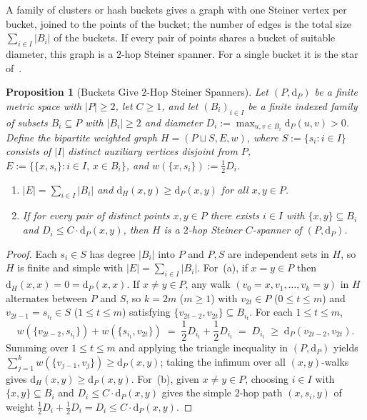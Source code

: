 \documentclass[11pt]{article}
\newtheorem{proposition}[theorem]{Proposition}
\theoremstyle{definition}
\theoremstyle{remark}
\newcommand{\dH}{\mathrm{d}_H}
\newcommand{\dP}{\mathrm{d}_P}
\begin{document}
A family of clusters or hash buckets gives a graph with one Steiner vertex per bucket, joined to the points of the bucket; the number of edges is the total size $\sum_{i \in I} |B_i|$ of the buckets. If every pair of points shares a bucket of suitable diameter, this graph is a $2$-hop Steiner spanner. For a single bucket it is the star of~\cite{andoni2023subquadratic}.

\begin{proposition}[Buckets Give $2$-Hop Steiner Spanners]
\label{prop:bucketing}
Let $(P, \dP)$ be a finite metric space with $|P| \ge 2$, let $C \ge 1$, and let $(B_i)_{i \in I}$ be a finite indexed family of subsets $B_i \subseteq P$ with $|B_i| \ge 2$ and diameter $D_i := \max_{u, v \in B_i} \dP(u, v) > 0$. Define the bipartite weighted graph $H = (P \sqcup S, E, w)$, where $S := \{s_i : i \in I\}$ consists of $|I|$ distinct auxiliary vertices disjoint from $P$, $E := \{\{x, s_i\} : i \in I,\, x \in B_i\}$, and $w(\{x, s_i\}) := \frac{1}{2} D_i$.
\begin{enumerate}[label=(\alph*),nosep]
  \item $|E| = \sum_{i \in I} |B_i|$ and $\dH(x, y) \ge \dP(x, y)$ for all $x, y \in P$.
  \item If for every pair of distinct points $x, y \in P$ there exists $i \in I$ with $\{x, y\} \subseteq B_i$ and $D_i \le C \cdot \dP(x, y)$, then $H$ is a $2$-hop Steiner $C$-spanner of $(P, \dP)$.
\end{enumerate}
\end{proposition}

\begin{proof}
Each $s_i \in S$ has degree $|B_i|$ into $P$ and $P, S$ are independent sets in $H$, so $H$ is finite and simple with $|E| = \sum_{i \in I} |B_i|$. For~(a), if $x = y \in P$ then $\dH(x, x) = 0 = \dP(x, x)$. If $x \ne y \in P$, any walk $(v_0 = x, v_1, \dots, v_k = y)$ in $H$ alternates between $P$ and $S$, so $k = 2m$ ($m \ge 1$) with $v_{2t} \in P$ ($0 \le t \le m$) and $v_{2t-1} = s_{i_t} \in S$ ($1 \le t \le m$) satisfying $\{v_{2t-2}, v_{2t}\} \subseteq B_{i_t}$. For each $1 \le t \le m$,
\[
w(\{v_{2t-2}, s_{i_t}\}) + w(\{s_{i_t}, v_{2t}\}) \;=\; \frac{1}{2} D_{i_t} + \frac{1}{2} D_{i_t} \;=\; D_{i_t} \;\ge\; \dP(v_{2t-2}, v_{2t}).
\]
Summing over $1 \le t \le m$ and applying the triangle inequality in $(P, \dP)$ yields $\sum_{j=1}^k w(\{v_{j-1}, v_j\}) \ge \dP(x, y)$; taking the infimum over all $(x, y)$-walks gives $\dH(x, y) \ge \dP(x, y)$. For~(b), given $x \ne y \in P$, choosing $i \in I$ with $\{x, y\} \subseteq B_i$ and $D_i \le C \cdot \dP(x, y)$ gives the simple $2$-hop path $(x, s_i, y)$ of weight $\frac{1}{2} D_i + \frac{1}{2} D_i = D_i \le C \cdot \dP(x, y)$.
\end{proof}
\end{document}
